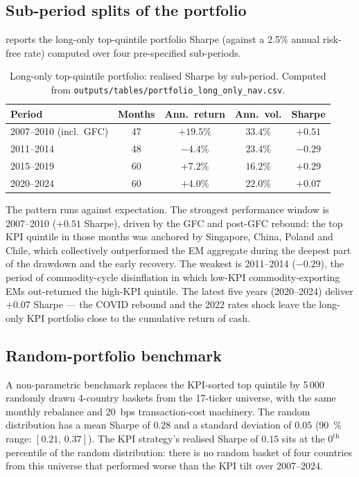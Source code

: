 \subsection{Sub-period splits of the portfolio}\label{sec:subperiod}

 reports the long-only top-quintile portfolio Sharpe (against a 2.5\% annual risk-free rate) computed over four pre-specified sub-periods.

\begin{table}[h]
  \centering\small
  \begin{threeparttable}
  \caption{Long-only top-quintile portfolio: realised Sharpe by sub-period. Computed from \texttt{outputs/tables/portfolio\_long\_only\_nav.csv}.}
  \label{tab:subperiod}
  \begin{tabular}{lcccc}
    \toprule
    Period & Months & Ann.\ return & Ann.\ vol. & Sharpe \\
    \midrule
    2007--2010 (incl.\ GFC) & 47 & $+19.5\%$ & $33.4\%$ & $+0.51$ \\
    2011--2014 & 48 & $-4.4\%$ & $23.4\%$ & $-0.29$ \\
    2015--2019 & 60 & $+7.2\%$ & $16.2\%$ & $+0.29$ \\
    2020--2024 & 60 & $+4.0\%$ & $22.0\%$ & $+0.07$ \\
    \bottomrule
  \end{tabular}
  \end{threeparttable}
\end{table}

The pattern runs against expectation. The strongest performance window is 2007--2010 ($+0.51$ Sharpe), driven by the GFC and post-GFC rebound: the top KPI quintile in those months was anchored by Singapore, China, Poland and Chile, which collectively outperformed the EM aggregate during the deepest part of the drawdown and the early recovery. The weakest is 2011--2014 ($-0.29$), the period of commodity-cycle disinflation in which low-KPI commodity-exporting EMs out-returned the high-KPI quintile. The latest five years (2020--2024) deliver $+0.07$ Sharpe --- the COVID rebound and the 2022 rates shock leave the long-only KPI portfolio close to the cumulative return of cash.

\subsection{Random-portfolio benchmark}

A non-parametric benchmark replaces the KPI-sorted top quintile by 5\,000 randomly drawn 4-country baskets from the 17-ticker universe, with the same monthly rebalance and 20~bps transaction-cost machinery. The random distribution has a mean Sharpe of $0.28$ and a standard deviation of $0.05$ (90~\% range: $[0.21,\,0.37]$). The KPI strategy's realised Sharpe of $0.15$ sits at the $0^{\text{th}}$ percentile of the random distribution: there is no random basket of four countries from this universe that performed worse than the KPI tilt over 2007--2024.

